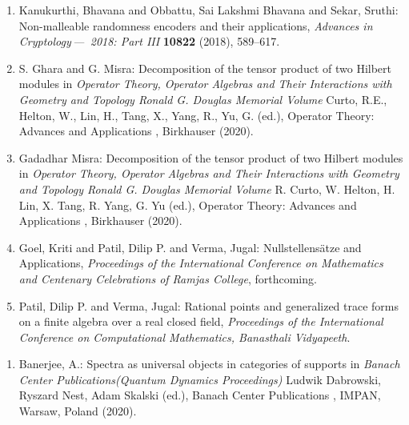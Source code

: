 \renewcommand{\theenumi}{C.\arabic{enumi}}
\begin{enumerate}%

	\item Kanukurthi, Bhavana and Obbattu, Sai Lakshmi Bhavana and
	      Sekar, Sruthi: Non-malleable randomness encoders and their applications, {\em Advances in
	      Cryptology\,---\, 2018: {P}art {III}} {\bf 10822} (2018), 589--617.

	\item S. Ghara and G. Misra: Decomposition of the tensor product of two Hilbert modules in {\em Operator Theory, Operator Algebras and Their Interactions with Geometry and Topology Ronald G. Douglas Memorial Volume} Curto, R.E., Helton, W., Lin, H., Tang, X., Yang, R., Yu, G. (ed.), Operator Theory: Advances and Applications , Birkhauser (2020).

	\item Gadadhar Misra: Decomposition of the tensor product of two Hilbert modules in {\em Operator Theory, Operator Algebras and Their Interactions with Geometry and Topology Ronald G. Douglas Memorial Volume} R. Curto, W. Helton, H. Lin, X. Tang, R. Yang, G. Yu (ed.), Operator Theory: Advances and Applications , Birkhauser (2020).

	\item\label{patil:Nullstellensaetze} Goel, Kriti and Patil, Dilip P. and Verma, Jugal: Nullstellens\"atze and Applications, {\em Proceedings of the International Conference on Mathematics and Centenary Celebrations of Ramjas College}, forthcoming.

	\item\label{patil:generalized-trace-forms} Patil, Dilip P.  and Verma, Jugal: Rational points and generalized trace forms on a finite algebra over a real closed field, {\em Proceedings of the International Conference on Computational Mathematics,  Banasthali Vidyapeeth}.
\end{enumerate}

\vspace{-1mm}

\begin{enumerate}[resume]%

	\item Banerjee, A.: Spectra as universal objects in categories of supports in {\em Banach Center Publications(Quantum Dynamics Proceedings)} Ludwik Dabrowski, Ryszard Nest, Adam Skalski (ed.), Banach Center Publications , IMPAN, Warsaw, Poland (2020).

\end{enumerate}

